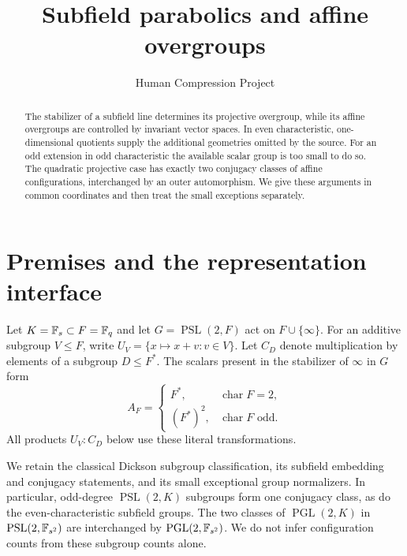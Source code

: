 \documentclass[11pt]{article}
\title{Subfield parabolics and affine overgroups}
\author{Human Compression Project}\date{}
\newcommand{\PSL}{\operatorname{PSL}}\newcommand{\PGL}{\operatorname{PGL}}
\begin{document}
\maketitle
\begin{abstract}
The stabilizer of a subfield line determines its projective overgroup,
while its affine overgroups are controlled by invariant vector spaces.
In even characteristic, one-dimensional quotients supply the additional
geometries omitted by the source. For an odd extension in odd
characteristic the available scalar group is too small to do so.
The quadratic projective case has exactly two conjugacy classes of
affine configurations, interchanged by an outer automorphism. We give
these arguments in common coordinates and then treat the small
exceptions separately.
\end{abstract}

\section{Premises and the representation interface}
Let $K=\mathbb F_s\subset F=\mathbb F_q$ and let $G=\PSL(2,F)$ act on
$F\cup\{\infty\}$. For an additive subgroup $V\le F$, write
$U_V=\{x\mapsto x+v:v\in V\}$. Let $C_D$ denote multiplication
by elements of a subgroup $D\le F^*$. The scalars present in the
stabilizer of $\infty$ in $G$ form
\[
 A_F=\begin{cases}F^*,&\operatorname{char}F=2,\\
 (F^*)^2,&\operatorname{char}F\text{ odd}.
 \end{cases}
\]
All products $U_V:C_D$ below use these literal transformations.

We retain the classical Dickson subgroup classification, its subfield
embedding and conjugacy statements, and its small exceptional group
normalizers. In particular, odd-degree $\PSL(2,K)$ subgroups form
one conjugacy class, as do the even-characteristic subfield groups.
The two classes of $\PGL(2,K)$ in $\PSL(2,\F_{s^2})$ are interchanged
by $\PGL(2,\F_{s^2})$. We do not infer configuration counts from these
subgroup counts alone.
\end{document}
